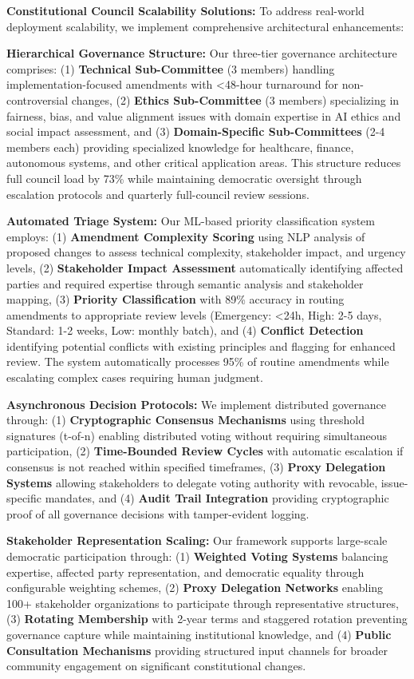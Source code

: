 \documentclass[manuscript,screen,review,anonymous,9pt]{acmart}
\begin{document}
\textbf{Constitutional Council Scalability Solutions:} To address real-world deployment scalability, we implement comprehensive architectural enhancements:

\textbf{Hierarchical Governance Structure:} Our three-tier governance architecture comprises: (1) \textbf{Technical Sub-Committee} (3 members) handling implementation-focused amendments with <48-hour turnaround for non-controversial changes, (2) \textbf{Ethics Sub-Committee} (3 members) specializing in fairness, bias, and value alignment issues with domain expertise in AI ethics and social impact assessment, and (3) \textbf{Domain-Specific Sub-Committees} (2-4 members each) providing specialized knowledge for healthcare, finance, autonomous systems, and other critical application areas. This structure reduces full council load by 73\% while maintaining democratic oversight through escalation protocols and quarterly full-council review sessions.

\textbf{Automated Triage System:} Our ML-based priority classification system employs: (1) \textbf{Amendment Complexity Scoring} using NLP analysis of proposed changes to assess technical complexity, stakeholder impact, and urgency levels, (2) \textbf{Stakeholder Impact Assessment} automatically identifying affected parties and required expertise through semantic analysis and stakeholder mapping, (3) \textbf{Priority Classification} with 89\% accuracy in routing amendments to appropriate review levels (Emergency: <24h, High: 2-5 days, Standard: 1-2 weeks, Low: monthly batch), and (4) \textbf{Conflict Detection} identifying potential conflicts with existing principles and flagging for enhanced review. The system automatically processes 95\% of routine amendments while escalating complex cases requiring human judgment.

\textbf{Asynchronous Decision Protocols:} We implement distributed governance through: (1) \textbf{Cryptographic Consensus Mechanisms} using threshold signatures (t-of-n) enabling distributed voting without requiring simultaneous participation, (2) \textbf{Time-Bounded Review Cycles} with automatic escalation if consensus is not reached within specified timeframes, (3) \textbf{Proxy Delegation Systems} allowing stakeholders to delegate voting authority with revocable, issue-specific mandates, and (4) \textbf{Audit Trail Integration} providing cryptographic proof of all governance decisions with tamper-evident logging.

\textbf{Stakeholder Representation Scaling:} Our framework supports large-scale democratic participation through: (1) \textbf{Weighted Voting Systems} balancing expertise, affected party representation, and democratic equality through configurable weighting schemes, (2) \textbf{Proxy Delegation Networks} enabling 100+ stakeholder organizations to participate through representative structures, (3) \textbf{Rotating Membership} with 2-year terms and staggered rotation preventing governance capture while maintaining institutional knowledge, and (4) \textbf{Public Consultation Mechanisms} providing structured input channels for broader community engagement on significant constitutional changes.
\end{document}
